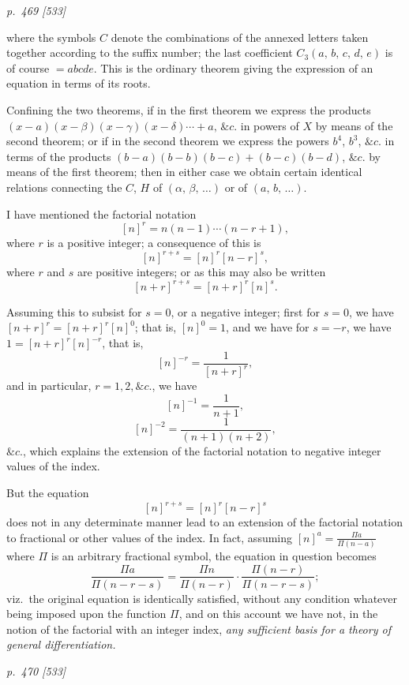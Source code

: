 \documentclass[11pt,a4paper]{book}
\begin{document}
\clearpage

\bigskip
\textit{p.~469 [533]}
\smallskip

\noindent
where the symbols $C$ denote the combinations of the annexed letters taken together
according to the suffix number; the last coefficient $C_3(a,\,b,\,c,\,d,\,e)$ is of course
$= abcde$. This is the ordinary theorem giving the expression of an equation in terms of
its roots.

Confining the two theorems, if in the first theorem we express the products
$(x-a)(x-\beta)(x-\gamma)(x-\delta)\cdots+a,\,\&c.$ in powers of $X$ by means of the second theorem;
or if in the second theorem we express the powers $b^4$, $b^3$, $\&c.$ in terms of the products
$(b-a)(b-b)(b-c)+(b-c)(b-d)$, $\&c.$ by means of the first theorem; then in either
case we obtain certain identical relations connecting the $C$, $H$ of $(\alpha,\,\beta,\,\ldots)$ or of
$(a,\,b,\,\ldots)$.

I have mentioned the factorial notation
\[
[n]^r = n(n-1)\cdots(n-r+1),
\]
where $r$ is a positive integer; a consequence of this is
\[
[n]^{r+s} = [n]^r[n-r]^s,
\]
where $r$ and $s$ are positive integers; or as this may also be written
\[
[n+r]^{r+s} = [n+r]^r[n]^s.
\]

Assuming this to subsist for $s = 0$, or a negative integer; first for $s = 0$, we have
$[n+r]^r = [n+r]^r[n]^0$; that is, $[n]^0 = 1$, and we have for $s = -r$, we have $1 = [n+r]^r[n]^{-r}$,
that is,
\[
[n]^{-r} = \frac{1}{[n+r]^r},
\]
and in particular, $r = 1, 2, \&c.$, we have
\[
[n]^{-1} = \frac{1}{n+1},
\]
\[
[n]^{-2} = \frac{1}{(n+1)(n+2)},
\]
$\&c.$,
which explains the extension of the factorial notation to negative integer values of the
index.

But the equation
\[
[n]^{r+s} = [n]^r[n-r]^s
\]
does not in any determinate manner lead to an extension of the factorial notation to
fractional or other values of the index. In fact, assuming $[n]^a = \frac{\Pi a}{\Pi(n-a)}$ where $\Pi$
is an arbitrary fractional symbol, the equation in question becomes
\[
\frac{\Pi a}{\Pi(n-r-s)} = \frac{\Pi n}{\Pi(n-r)} \cdot \frac{\Pi(n-r)}{\Pi(n-r-s)};
\]
viz.\ the original equation is identically satisfied, without any condition whatever being
imposed upon the function $\Pi$, and on this account we have not, in the notion of the
factorial with an integer index, \textit{any sufficient basis for a theory of general differentiation.}

\clearpage

\bigskip
\textit{p.~470 [533]}
\smallskip
\end{document}

